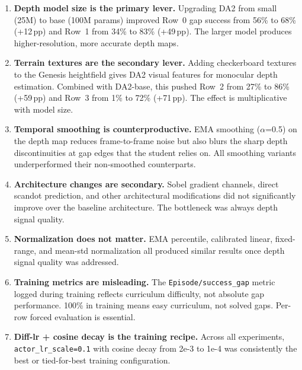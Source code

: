 \documentclass[11pt,a4paper]{article}
\begin{document}
\begin{enumerate}
  \item \textbf{Depth model size is the primary lever.}  Upgrading DA2
        from small (25M) to base (100M params) improved Row~0 gap success
        from 56\% to 68\% (+12\,pp) and Row~1 from 34\% to 83\% (+49\,pp).
        The larger model produces higher-resolution, more accurate depth maps.

  \item \textbf{Terrain textures are the secondary lever.}  Adding
        checkerboard textures to the Genesis heightfield gives DA2 visual
        features for monocular depth estimation.  Combined with DA2-base,
        this pushed Row~2 from 27\% to 86\% (+59\,pp) and Row~3 from 1\%
        to 72\% (+71\,pp).  The effect is multiplicative with model size.

  \item \textbf{Temporal smoothing is counterproductive.}  EMA smoothing
        ($\alpha$=0.5) on the depth map reduces frame-to-frame noise but
        also blurs the sharp depth discontinuities at gap edges that the
        student relies on.  All smoothing variants underperformed their
        non-smoothed counterparts.

  \item \textbf{Architecture changes are secondary.}  Sobel gradient
        channels, direct scandot prediction, and other architectural
        modifications did not significantly improve over the baseline
        architecture.  The bottleneck was always depth signal quality.

  \item \textbf{Normalization does not matter.}  EMA percentile, calibrated
        linear, fixed-range, and mean-std normalization all produced similar
        results once depth signal quality was addressed.

  \item \textbf{Training metrics are misleading.}  The \texttt{Episode/success\_gap}
        metric logged during training reflects curriculum difficulty, not
        absolute gap performance.  100\% in training means easy curriculum,
        not solved gaps.  Per-row forced evaluation is essential.

  \item \textbf{Diff-lr + cosine decay is the training recipe.}  Across
        all experiments, \texttt{actor\_lr\_scale=0.1} with cosine decay
        from 2e-3 to 1e-4 was consistently the best or tied-for-best
        training configuration.
\end{enumerate}
\end{document}
